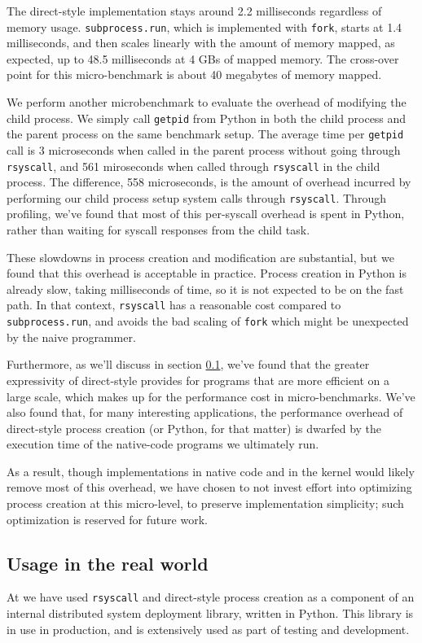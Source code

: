 \documentclass[letterpaper,twocolumn,10pt]{article}
\begin{document}
The direct-style implementation stays around 2.2 milliseconds regardless of memory usage.
\texttt{subprocess.run}, which is implemented with \texttt{fork},
starts at 1.4 milliseconds,
and then scales linearly with the amount of memory mapped, as expected,
up to 48.5 milliseconds at 4 GBs of mapped memory.
The cross-over point for this micro-benchmark is about 40 megabytes of memory mapped.

We perform another microbenchmark to evaluate the overhead of modifying the child process.
We simply call \texttt{getpid} from Python
in both the child process and the parent process on the same benchmark setup.
The average time per \texttt{getpid} call is
3 microseconds when called in the parent process without going through \texttt{rsyscall},
and 561 miroseconds when called through \texttt{rsyscall} in the child process.
The difference, 558 microseconds,
is the amount of overhead incurred
by performing our child process setup system calls through \texttt{rsyscall}.
Through profiling, we've found that most of this per-syscall overhead is spent in Python,
rather than waiting for syscall responses from the child task.

These slowdowns in process creation and modification are substantial,
but we found that this overhead is acceptable in practice.
Process creation in Python is already slow, taking milliseconds of time,
so it is not expected to be on the fast path.
In that context, \texttt{rsyscall} has a reasonable cost compared to \texttt{subprocess.run},
and avoids the bad scaling of \texttt{fork} which might be unexpected by the naive programmer.

Furthermore, as we'll discuss in section \ref{realworld},
we've found that the greater expressivity of direct-style
provides for programs that are more efficient on a large scale,
which makes up for the performance cost in micro-benchmarks.
We've also found that, for many interesting applications,
the performance overhead of direct-style process creation (or Python, for that matter)
is dwarfed by the execution time of the native-code programs we ultimately run.

As a result, though implementations in native code and in the kernel would likely remove most of this overhead,
we have chosen to not invest effort into optimizing process creation at this micro-level,
to preserve implementation simplicity;
such optimization is reserved for future work.
\subsection{Usage in the real world}\label{realworld}
At \twosigma we have used \texttt{rsyscall} and direct-style process creation
as a component of an internal distributed system deployment library, written in Python.
This library is in use in production,
and is extensively used as part of testing and development.
\end{document}
